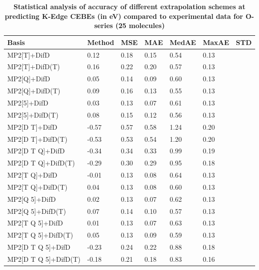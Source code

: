 \begin{table}
  \caption{\textbf{Statistical analysis of accuracy of different extrapolation schemes at predicting K-Edge CEBEs (in eV) compared to experimental data for O-series (25 molecules)}}
  \begin{tabular}{l l l l l l l }
    \toprule
    \textbf{Basis} & \textbf{Method} & \textbf{MSE} & \textbf{MAE} & \textbf{MedAE} & \textbf{MaxAE} & \textbf{STD} \\ 
    \midrule
    MP2[T]+DifD & 0.12 & 0.18 & 0.15 & 0.54 & 0.13 \\ 
    MP2[T]+DifD(T) & 0.16 & 0.22 & 0.20 & 0.57 & 0.13 \\ 
    MP2[Q]+DifD & 0.05 & 0.14 & 0.09 & 0.60 & 0.13 \\ 
    MP2[Q]+DifD(T) & 0.09 & 0.16 & 0.13 & 0.55 & 0.13 \\ 
    MP2[5]+DifD & 0.03 & 0.13 & 0.07 & 0.61 & 0.13 \\ 
    MP2[5]+DifD(T) & 0.08 & 0.15 & 0.12 & 0.56 & 0.13 \\ 
    MP2[D T]+DifD & -0.57 & 0.57 & 0.58 & 1.24 & 0.20 \\ 
    MP2[D T]+DifD(T) & -0.53 & 0.53 & 0.54 & 1.20 & 0.20 \\ 
    MP2[D T Q]+DifD & -0.34 & 0.34 & 0.33 & 0.99 & 0.19 \\ 
    MP2[D T Q]+DifD(T) & -0.29 & 0.30 & 0.29 & 0.95 & 0.18 \\ 
    MP2[T Q]+DifD & -0.01 & 0.13 & 0.08 & 0.64 & 0.13 \\ 
    MP2[T Q]+DifD(T) & 0.04 & 0.13 & 0.08 & 0.60 & 0.13 \\ 
    MP2[Q 5]+DifD & 0.02 & 0.13 & 0.07 & 0.62 & 0.13 \\ 
    MP2[Q 5]+DifD(T) & 0.07 & 0.14 & 0.10 & 0.57 & 0.13 \\ 
    MP2[T Q 5]+DifD & 0.01 & 0.13 & 0.07 & 0.63 & 0.13 \\ 
    MP2[T Q 5]+DifD(T) & 0.05 & 0.13 & 0.09 & 0.59 & 0.13 \\ 
    MP2[D T Q 5]+DifD & -0.23 & 0.24 & 0.22 & 0.88 & 0.18 \\ 
    MP2[D T Q 5]+DifD(T) & -0.18 & 0.21 & 0.18 & 0.83 & 0.16 \\ 
    \bottomrule
  \end{tabular}
\end{table}
